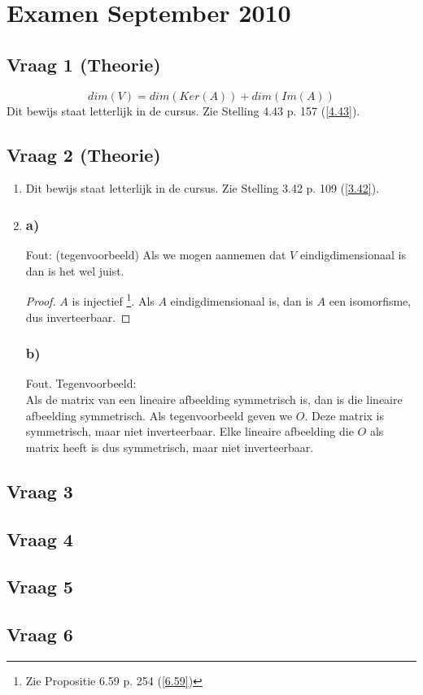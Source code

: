 \documentclass[lineaire_algebra_oplossingen.tex]{subfiles}
\begin{document}
\section{Examen September 2010}
\subsection{Vraag 1 (Theorie)}
\[
dim(V) = dim(Ker(A)) + dim(Im(A))
\]
Dit bewijs staat letterlijk in de cursus. Zie Stelling 4.43 p. 157 (\ref{4.43}).
\subsection{Vraag 2 (Theorie)}
\begin{enumerate}[1.]
\item
Dit bewijs staat letterlijk in de cursus. Zie Stelling 3.42 p. 109 (\ref{3.42}).
\item
\subsubsection*{a)}
Fout: (tegenvoorbeeld) Als we mogen aannemen dat $V$ eindigdimensionaal is dan is het wel juist.
\begin{proof}
$A$ is injectief \footnote{Zie Propositie 6.59 p. 254 (\ref{6.59})}.
Als $A$ eindigdimensionaal is, dan is $A$ een isomorfisme, dus inverteerbaar.
\end{proof}

\subsubsection*{b)}
Fout. Tegenvoorbeeld:\\
Als de matrix van een lineaire afbeelding symmetrisch is, dan is die lineaire afbeelding symmetrisch. Als tegenvoorbeeld geven we $O$. Deze matrix is symmetrisch, maar niet inverteerbaar. Elke lineaire afbeelding die $O$ als matrix heeft is dus symmetrisch, maar niet inverteerbaar.
\end{enumerate}

\subsection{Vraag 3}
\subsection{Vraag 4}
\subsection{Vraag 5}
\subsection{Vraag 6}
\end{document}
